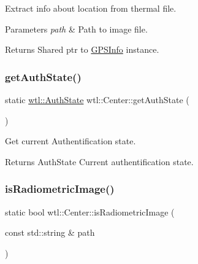 Extract info about location from thermal file. 


\begin{DoxyParams}{Parameters}
{\em path} & Path to image file. \\
\hline
\end{DoxyParams}
\begin{DoxyReturn}{Returns}
Shared ptr to \hyperlink{classwtl_1_1_g_p_s_info}{G\+P\+S\+Info} instance. 
\end{DoxyReturn}
\mbox{\label{classwtl_1_1_center_a54d31f4aafa2c68a86b7fd005aed26c4}} 
\subsubsection{\texorpdfstring{get\+Auth\+State()}{getAuthState()}}
{\footnotesize\ttfamily static \hyperlink{namespacewtl_a74cc3b258b8e82a1d6e032fb4c937353}{wtl\+::\+Auth\+State} wtl\+::\+Center\+::get\+Auth\+State (\begin{DoxyParamCaption}{ }\end{DoxyParamCaption})\hspace{0.3cm}{\ttfamily [static]}}



Get current Authentification state. 

\begin{DoxyReturn}{Returns}
Auth\+State Current authentification state. 
\end{DoxyReturn}
\mbox{\label{classwtl_1_1_center_aa05f3d730217ce0208b3e290a3590e2a}} 
\subsubsection{\texorpdfstring{is\+Radiometric\+Image()}{isRadiometricImage()}}
{\footnotesize\ttfamily static bool wtl\+::\+Center\+::is\+Radiometric\+Image (\begin{DoxyParamCaption}\item[{const std\+::string \&}]{path }\end{DoxyParamCaption})\hspace{0.3cm}{\ttfamily [static]}}



